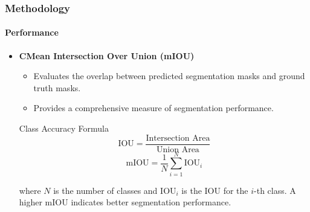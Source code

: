 \documentclass[aspectratio=169, lecture, amberg]{OTHAWbeamer}
\begin{document}
\begin{frame}[t]
    \frametitle{Methodology}
    \framesubtitle{Performance}

    \begin{itemize}
        \item \textbf{CMean Intersection Over Union (mIOU)}
        \begin{itemize}
            \item Evaluates the overlap between predicted segmentation masks and ground truth masks.
            \item Provides a comprehensive measure of segmentation performance.

        \end{itemize}
        \begin{block}{Class Accuracy Formula}
        \[
    \text{IOU} = \frac{\text{Intersection Area}}{\text{Union Area}}
    \]
    \[
    \text{mIOU} = \frac{1}{N} \sum_{i=1}^{N} \text{IOU}_i
    \]
        \end{block}
        where \(N\) is the number of classes and \(\text{IOU}_i\) is the IOU for the \(i\)-th class. A higher mIOU indicates better segmentation performance.

    \end{itemize}
    
\end{frame}
\end{document}
